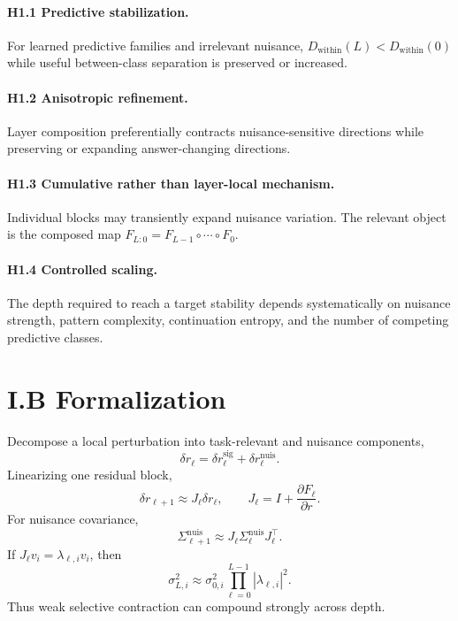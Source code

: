 \documentclass[10pt]{article}
\begin{document}
\paragraph{H1.1 Predictive stabilization.} For learned predictive families and irrelevant nuisance, $D_{\mathrm{within}}(L)<D_{\mathrm{within}}(0)$ while useful between-class separation is preserved or increased.
\paragraph{H1.2 Anisotropic refinement.} Layer composition preferentially contracts nuisance-sensitive directions while preserving or expanding answer-changing directions.
\paragraph{H1.3 Cumulative rather than layer-local mechanism.} Individual blocks may transiently expand nuisance variation. The relevant object is the composed map $F_{L:0}=F_{L-1}\circ\cdots\circ F_0$.
\paragraph{H1.4 Controlled scaling.} The depth required to reach a target stability depends systematically on nuisance strength, pattern complexity, continuation entropy, and the number of competing predictive classes.

\section{I.B Formalization}
Decompose a local perturbation into task-relevant and nuisance components,
\begin{equation}\delta r_\ell=\delta r_\ell^{\mathrm{sig}}+\delta r_\ell^{\mathrm{nuis}}.\end{equation}
Linearizing one residual block,
\begin{equation}\delta r_{\ell+1}\approx J_\ell\delta r_\ell,\qquad J_\ell=I+\frac{\partial F_\ell}{\partial r}.\end{equation}
For nuisance covariance,
\begin{equation}\Sigma_{\ell+1}^{\mathrm{nuis}}\approx J_\ell\Sigma_\ell^{\mathrm{nuis}}J_\ell^\top.\end{equation}
If $J_\ell v_i=\lambda_{\ell,i}v_i$, then
\begin{equation}\sigma_{L,i}^2\approx\sigma_{0,i}^2\prod_{\ell=0}^{L-1}|\lambda_{\ell,i}|^2.\end{equation}
Thus weak selective contraction can compound strongly across depth.
\end{document}
